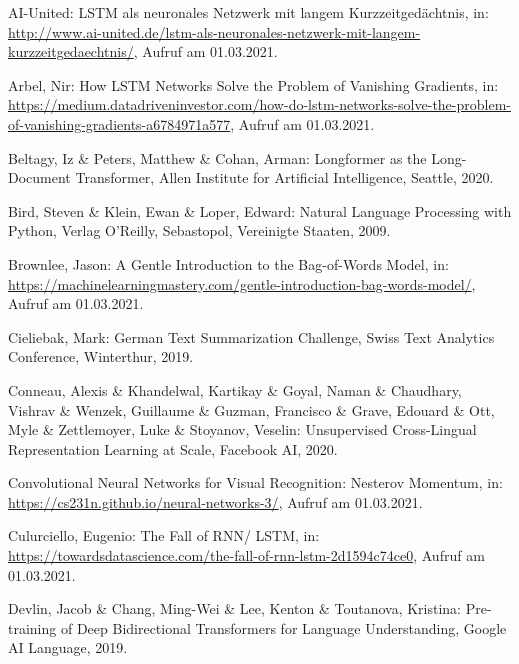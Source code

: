 \setcounter{page}{85}

\begin{thebibliography}{85}
\thispagestyle{fancy}

AI-United: LSTM als neuronales Netzwerk mit langem Kurzzeitgedächtnis, in: \url{http://www.ai-united.de/lstm-als-neuronales-netzwerk-mit-langem-kurzzeitgedaechtnis/}, Aufruf am 01.03.2021.

Arbel, Nir: How LSTM Networks Solve the Problem of Vanishing Gradients, in: \url{https://medium.datadriveninvestor.com/how-do-lstm-networks-solve-the-problem-of-vanishing-gradients-a6784971a577}, Aufruf am 01.03.2021.

Beltagy, Iz \& Peters, Matthew \& Cohan, Arman: Longformer as the Long-Document Transformer, Allen Institute for Artificial Intelligence, Seattle, 2020.

Bird, Steven \& Klein, Ewan \& Loper, Edward: Natural Language Processing with Python, Verlag O'Reilly, Sebastopol, Vereinigte Staaten, 2009.

Brownlee, Jason: A Gentle Introduction to the Bag-of-Words Model, in: \url{https://machinelearningmastery.com/gentle-introduction-bag-words-model/}, Aufruf am 01.03.2021.

Cieliebak, Mark: German Text Summarization Challenge, Swiss Text Analytics Conference, Winterthur, 2019.

Conneau, Alexis \& Khandelwal, Kartikay \& Goyal, Naman \& Chaudhary, Vishrav \& Wenzek, Guillaume \& Guzman, Francisco \& Grave, Edouard \& Ott, Myle \& Zettlemoyer, Luke \& Stoyanov, Veselin: Unsupervised Cross-Lingual Representation Learning at Scale, Facebook AI, 2020.

Convolutional Neural Networks for Visual Recognition: Nesterov Momentum, in: \url{https://cs231n.github.io/neural-networks-3/}, Aufruf am 01.03.2021.

Culurciello, Eugenio: The Fall of RNN/ LSTM, in: \url{https://towardsdatascience.com/the-fall-of-rnn-lstm-2d1594c74ce0}, Aufruf am 01.03.2021.

Devlin, Jacob \& Chang, Ming-Wei \& Lee, Kenton \& Toutanova, Kristina: Pre-training of Deep Bidirectional Transformers for
Language Understanding, Google AI Language, 2019.


\end{thebibliography}
